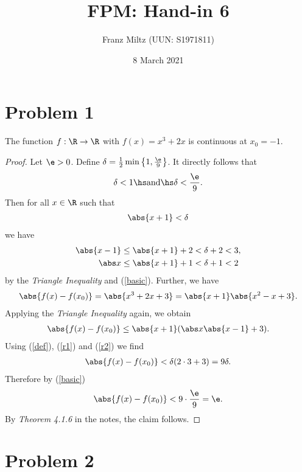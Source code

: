 \documentclass{article}
\begin{document}
\title{FPM: Hand-in 6}
\author{Franz Miltz (UUN: S1971811)}
\date{8 March 2021}
\maketitle
\mkthms

\section*{Problem 1}

\begin{claim*}
	The function $f:\R\to\R$ with $f(x) = x^3+2x$ is continuous at $x_0=-1$.
\end{claim*}
\begin{proof}
	Let $\e>0$. Define $\delta = \frac{1}{2}\min\left\lbrace1,\frac{\e}{9}\right\rbrace$. It directly follows that
	\begin{align}
		\label{basic}
		\delta< 1\hs\text{and}\hs \delta <\frac{\e}{9}.
	\end{align}
	Then for all $x\in\R$ such that
	\begin{align}
		\label{def}
		\abs{x+1}<\delta
	\end{align}
	we have
	\begin{align}
		\label{r1}
		\abs{x-1} & \leq \abs{x+1} + 2 < \delta + 2 < 3, \\
		\label{r2}
		\abs x    & \leq \abs{x+1}+1 < \delta + 1 < 2
	\end{align}
	by the \emph{Triangle Inequality} and (\ref{basic}). Further, we have
	\begin{align*}
		\abs{f(x)-f(x_0)}=\abs{x^3+2x+3}=\abs{x+1}\abs{x^2-x+3}.
	\end{align*}
	Applying the \emph{Triangle Inequality} again, we obtain
	\begin{align*}
		\abs{f(x)-f(x_0)}\leq \abs{x+1}(\abs x\abs{x-1}+3).
	\end{align*}
	Using (\ref{def}), (\ref{r1}) and (\ref{r2}) we find
	\begin{align*}
		\abs{f(x)-f(x_0)} < \delta (2\cdot 3 + 3) = 9\delta.
	\end{align*}
	Therefore by (\ref{basic})
	\begin{align*}
		\abs{f(x)-f(x_0)} < 9\cdot\frac{\e}{9}=\e.
	\end{align*}
	By \emph{Theorem 4.1.6} in the notes, the claim follows.
\end{proof}

\section*{Problem 2}
\end{document}
